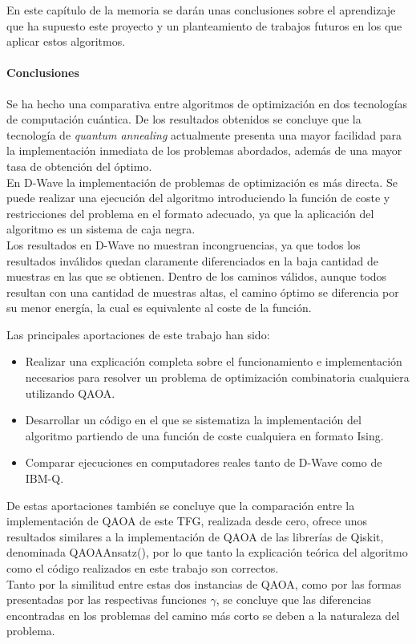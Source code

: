En este capítulo de la memoria se darán unas conclusiones sobre el aprendizaje que ha supuesto este proyecto y un planteamiento de trabajos futuros en los que aplicar estos algoritmos.

\paragraph{Conclusiones}
Se ha hecho una comparativa entre algoritmos de optimización en dos tecnologías de computación cuántica.
De los resultados obtenidos se concluye que la tecnología de \textit{quantum annealing} actualmente presenta una mayor facilidad para la implementación inmediata de los problemas abordados, además de una mayor tasa de obtención del óptimo.
\\
En D-Wave la implementación de problemas de optimización es más directa.
Se puede realizar una ejecución del algoritmo introduciendo la función de coste y restricciones del problema en el formato adecuado, ya que la aplicación del algoritmo es un sistema de caja negra.
\\
Los resultados en D-Wave no muestran incongruencias, ya que todos los resultados inválidos quedan claramente diferenciados en la baja cantidad de muestras en las que se obtienen.
Dentro de los caminos válidos, aunque todos resultan con una cantidad de muestras altas, el camino óptimo se diferencia por su menor energía, la cual es equivalente al coste de la función.

Las principales aportaciones de este trabajo han sido:

\begin{itemize}
\item Realizar una explicación completa sobre el funcionamiento e implementación necesarios para resolver un problema de optimización combinatoria cualquiera utilizando QAOA\@.
  
\item Desarrollar un código en el que se sistematiza la implementación del algoritmo partiendo de una función de coste cualquiera en formato Ising.

\item Comparar ejecuciones en computadores reales tanto de D-Wave como de IBM-Q.
\end{itemize}

De estas aportaciones también se concluye que la comparación entre la implementación de QAOA de este TFG, realizada desde cero, ofrece unos resultados similares a la implementación de QAOA de las librerías de Qiskit, denominada QAOAAnsatz(), por lo que tanto la explicación teórica del algoritmo como el código realizados en este trabajo son correctos.
\\
Tanto por la similitud entre estas dos instancias de QAOA, como por las formas presentadas por las respectivas funciones $\gamma$, se concluye que las diferencias encontradas en los problemas del camino más corto se deben a la naturaleza del problema.

